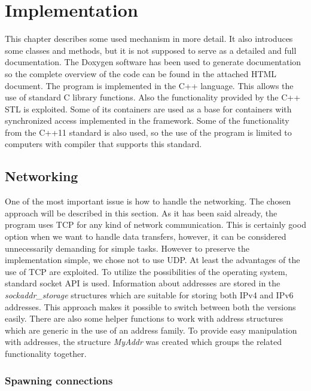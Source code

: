\chapter{Implementation}\label{implementation}

This chapter describes some used mechanism in more detail. It also
introduces some classes and methods, but it is not supposed to serve as
a detailed and full documentation. The Doxygen software has been used to
generate documentation so the complete overview of the code can be found
in the attached HTML document. The program is implemented in the C++
language. This allows the use of standard C library functions. Also the
functionality provided by the C++ STL is exploited. Some of its
containers are used as a base for containers with synchronized access
implemented in the framework. Some of the functionality from the C++11
standard is also used, so the use of the program is limited to computers
with compiler that supports this standard.

\section{Networking}\label{networking}

One of the most important issue is how to handle the networking. The
chosen approach will be described in this section. As it has been said
already, the program uses TCP for any kind of network communication.
This is certainly good option when we want to handle data transfers,
however, it can be considered unnecessarily demanding for simple tasks.
However to preserve the implementation simple, we chose not to use UDP.
At least the advantages of the use of TCP are exploited. To utilize the
possibilities of the operating system, standard socket API is used.
Information about addresses are stored in the \textit{sockaddr\_storage}
structures which are suitable for storing both IPv4 and IPv6 addresses.
This approach makes it possible to switch between both the versions
easily. There are also some helper functions to work with address
structures which are generic in the use of an address family. To provide
easy manipulation with addresses, the structure \textit{MyAddr} was
created which groups the related functionality together.

\subsection{Spawning connections}\label{spawning-connections}

